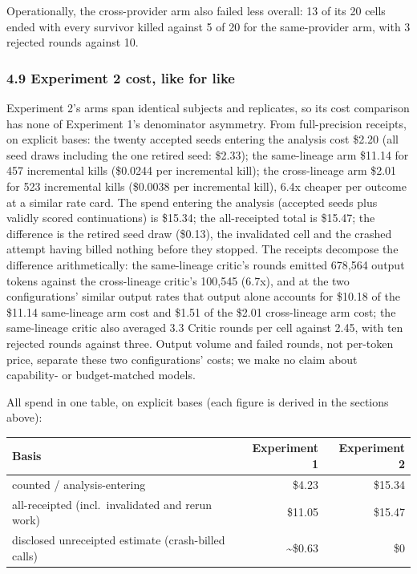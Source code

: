 \documentclass[
  11pt,
]{article}
\newcounter{none} %
\begin{document}
Operationally, the cross-provider arm also failed less overall: 13 of
its 20 cells ended with every survivor killed against 5 of 20 for the
same-provider arm, with 3 rejected rounds against 10.

\subsubsection{4.9 Experiment 2 cost, like for
like}\label{experiment-2-cost-like-for-like}

Experiment 2's arms span identical subjects and replicates, so its cost
comparison has none of Experiment 1's denominator asymmetry. From
full-precision receipts, on explicit bases: the twenty accepted seeds
entering the analysis cost \$2.20 (all seed draws including the one
retired seed: \$2.33); the same-lineage arm \$11.14 for 457 incremental
kills (\$0.0244 per incremental kill); the cross-lineage arm \$2.01 for
523 incremental kills (\$0.0038 per incremental kill), 6.4x cheaper per
outcome at a similar rate card. The spend entering the analysis
(accepted seeds plus validly scored continuations) is \$15.34; the
all-receipted total is \$15.47; the difference is the retired seed draw
(\$0.13), the invalidated cell and the crashed attempt having billed
nothing before they stopped. The receipts decompose the difference
arithmetically: the same-lineage critic's rounds emitted 678,564 output
tokens against the cross-lineage critic's 100,545 (6.7x), and at the two
configurations' similar output rates that output alone accounts for
\$10.18 of the \$11.14 same-lineage arm cost and \$1.51 of the \$2.01
cross-lineage arm cost; the same-lineage critic also averaged 3.3 Critic
rounds per cell against 2.45, with ten rejected rounds against three.
Output volume and failed rounds, not per-token price, separate these two
configurations' costs; we make no claim about capability- or
budget-matched models.

All spend in one table, on explicit bases (each figure is derived in the
sections above):

{\def\LTcaptype{none} %
\begin{longtable}[]{@{}lrr@{}}
\toprule\noalign{}
Basis & Experiment 1 & Experiment 2 \\
\midrule\noalign{}
\endhead
\bottomrule\noalign{}
\endlastfoot
counted / analysis-entering & \$4.23 & \$15.34 \\
all-receipted (incl.~invalidated and rerun work) & \$11.05 & \$15.47 \\
disclosed unreceipted estimate (crash-billed calls) &
\textasciitilde\$0.63 & \$0 \\
\end{longtable}
}
\end{document}
